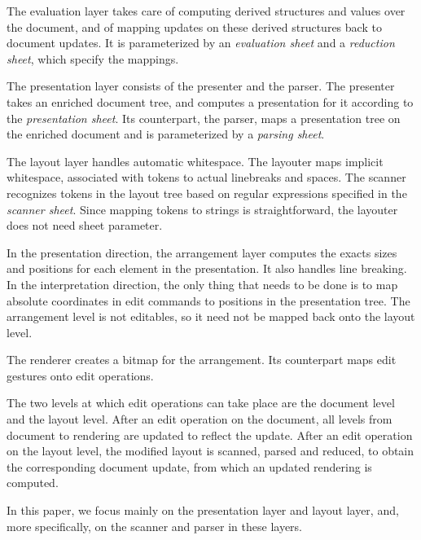 \documentclass[12pt]{article}
\begin{document}
\noindent The evaluation layer takes care of computing derived structures and values over the document, and of mapping updates on these derived structures back to document updates. It is parameterized by an {\em evaluation sheet} and a {\em reduction sheet}, which specify the mappings. 

\noindent The presentation layer consists of the presenter and the parser. The presenter takes an enriched document tree, and computes a presentation for it according to the {\em presentation sheet}. Its counterpart, the parser, maps a presentation tree on the enriched document and is parameterized by a {\em parsing sheet}.

\noindent The layout layer handles automatic whitespace. The layouter maps implicit whitespace, associated with tokens to actual linebreaks and spaces. The scanner recognizes tokens in the layout tree based on regular expressions specified in the {\em scanner sheet}. Since mapping tokens to strings is straightforward, the layouter does not need sheet parameter.

\noindent In the presentation direction, the arrangement layer computes the exacts sizes and positions for each element in the presentation. It also handles line breaking. In the interpretation direction, the only thing that needs to be done is to map absolute coordinates in edit commands to positions in the presentation tree. The arrangement level is not editables, so it need not be mapped back onto the layout level.

\noindent The renderer creates a bitmap for the arrangement. Its counterpart maps edit gestures onto edit operations.


The two levels at which edit operations can take place are the document level and the layout level. After an edit operation on the document, all levels from document to rendering are updated to reflect the update. After an edit operation on the layout level, the modified layout is scanned, parsed and reduced, to obtain the corresponding document update, from which an updated rendering is computed. 

In this paper, we focus mainly on the presentation layer and layout layer, and, more specifically, on the scanner and parser in these layers.
\end{document}
